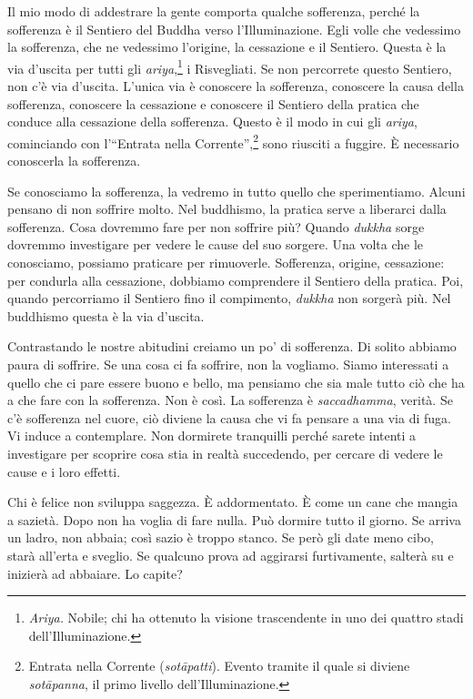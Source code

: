 Il mio modo di addestrare la gente comporta qualche sofferenza, perché
la sofferenza è il Sentiero del Buddha verso l'Illuminazione. Egli
volle che vedessimo la sofferenza, che ne vedessimo l'origine, la
cessazione e il Sentiero. Questa è la via d'uscita per tutti gli
\emph{ariya},\footnote{\emph{Ariya.} Nobile; chi ha ottenuto la visione
  trascendente in uno dei quattro stadi dell'Illuminazione.} i
Risvegliati. Se non percorrete questo Sentiero, non c'è via d'uscita.
L'unica via è conoscere la sofferenza, conoscere la causa della
sofferenza, conoscere la cessazione e conoscere il Sentiero della
pratica che conduce alla cessazione della sofferenza. Questo è il modo
in cui gli \emph{ariya}, cominciando con l'``Entrata nella
Corrente'',\footnote{Entrata nella Corrente (\emph{sotāpatti}). Evento
  tramite il quale si diviene \emph{sotāpanna}, il primo livello
  dell'Illuminazione.} sono riusciti a fuggire. È necessario conoscerla
la sofferenza.

Se conosciamo la sofferenza, la vedremo in tutto quello che
sperimentiamo. Alcuni pensano di non soffrire molto. Nel buddhismo, la
pratica serve a liberarci dalla sofferenza. Cosa dovremmo fare per non
soffrire più? Quando \emph{dukkha} sorge dovremmo investigare per vedere
le cause del suo sorgere. Una volta che le conosciamo, possiamo
praticare per rimuoverle. Sofferenza, origine, cessazione: per condurla
alla cessazione, dobbiamo comprendere il Sentiero della pratica. Poi,
quando percorriamo il Sentiero fino il compimento, \emph{dukkha} non
sorgerà più. Nel buddhismo questa è la via d'uscita.

Contrastando le nostre abitudini creiamo un po' di sofferenza. Di solito
abbiamo paura di soffrire. Se una cosa ci fa soffrire, non la vogliamo.
Siamo interessati a quello che ci pare essere buono e bello, ma pensiamo
che sia male tutto ciò che ha a che fare con la sofferenza. Non è così.
La sofferenza è \emph{saccadhamma}, verità. Se c'è sofferenza nel cuore,
ciò diviene la causa che vi fa pensare a una via di fuga. Vi induce a
contemplare. Non dormirete tranquilli perché sarete intenti a
investigare per scoprire cosa stia in realtà succedendo, per cercare di
vedere le cause e i loro effetti.

Chi è felice non sviluppa saggezza. È addormentato. È come un cane che
mangia a sazietà. Dopo non ha voglia di fare nulla. Può dormire tutto il
giorno. Se arriva un ladro, non abbaia; così sazio è troppo stanco. Se
però gli date meno cibo, starà all'erta e sveglio. Se qualcuno prova ad
aggirarsi furtivamente, salterà su e inizierà ad abbaiare. Lo capite?

